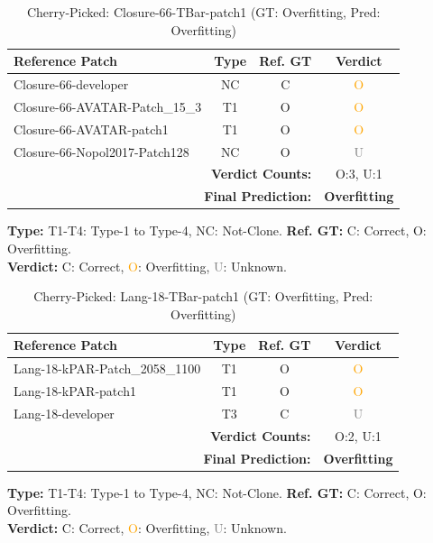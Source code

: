 \begin{table}[t]
\centering
\caption{Cherry-Picked: Closure-66-TBar-patch1 (GT: Overfitting, Pred: Overfitting)}
\label{tab:cherry-Closure66TBarpatch1}
\footnotesize
\renewcommand{\arraystretch}{1.1}
\setlength{\tabcolsep}{4pt}
\begin{tabular}{l|c|c|c}
\hline
\textbf{Reference Patch} & \textbf{Type} & \textbf{Ref. GT} & \textbf{Verdict} \\
\hline
Closure-66-developer & NC & C & \textcolor{orange}{O} \\
Closure-66-AVATAR-Patch\_15\_3 & T1 & O & \textcolor{orange}{O} \\
Closure-66-AVATAR-patch1 & T1 & O & \textcolor{orange}{O} \\
Closure-66-Nopol2017-Patch128 & NC & O & \textcolor{gray}{U} \\
\hline
\multicolumn{3}{r|}{\textbf{Verdict Counts:}} & O:3, U:1 \\
\multicolumn{3}{r|}{\textbf{Final Prediction:}} & \textbf{Overfitting} \\
\hline
\end{tabular}
\vspace{1mm}
\parbox{\linewidth}{\centering\footnotesize 
\vspace{1mm}
\textbf{Type:} T1-T4: Type-1 to Type-4, NC: Not-Clone. \;
\textbf{Ref. GT:} C: Correct, O: Overfitting. \\
\textbf{Verdict:} \textcolor{green!60!black}{C}: Correct, \textcolor{orange}{O}: Overfitting, \textcolor{gray}{U}: Unknown.}
\end{table}


\begin{table}[t]
\centering
\caption{Cherry-Picked: Lang-18-TBar-patch1 (GT: Overfitting, Pred: Overfitting)}
\label{tab:cherry-Lang18TBarpatch1}
\footnotesize
\renewcommand{\arraystretch}{1.1}
\setlength{\tabcolsep}{4pt}
\begin{tabular}{l|c|c|c}
\hline
\textbf{Reference Patch} & \textbf{Type} & \textbf{Ref. GT} & \textbf{Verdict} \\
\hline
Lang-18-kPAR-Patch\_2058\_1100 & T1 & O & \textcolor{orange}{O} \\
Lang-18-kPAR-patch1 & T1 & O & \textcolor{orange}{O} \\
Lang-18-developer & T3 & C & \textcolor{gray}{U} \\
\hline
\multicolumn{3}{r|}{\textbf{Verdict Counts:}} & O:2, U:1 \\
\multicolumn{3}{r|}{\textbf{Final Prediction:}} & \textbf{Overfitting} \\
\hline
\end{tabular}
\vspace{1mm}
\parbox{\linewidth}{\centering\footnotesize 
\vspace{1mm}
\textbf{Type:} T1-T4: Type-1 to Type-4, NC: Not-Clone. \;
\textbf{Ref. GT:} C: Correct, O: Overfitting. \\
\textbf{Verdict:} \textcolor{green!60!black}{C}: Correct, \textcolor{orange}{O}: Overfitting, \textcolor{gray}{U}: Unknown.}
\end{table}


